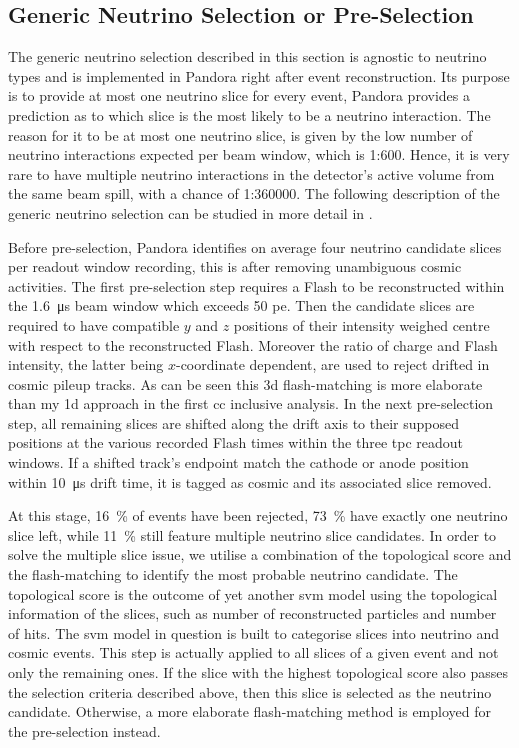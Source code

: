 \subsection{Generic Neutrino Selection or Pre-Selection} \label{sec:NewPreSelection}
The generic neutrino selection described in this section is agnostic to neutrino types and is implemented in \gls{Pandora} right after event reconstruction. Its purpose is to provide at most one neutrino slice for every event, \ie \gls{Pandora} provides a prediction as to which slice is the most likely to be a neutrino interaction. The reason for it to be at most one neutrino slice, is given by the low number of neutrino interactions expected per beam window, which is \num{1}:\num{600}. Hence, it is very rare to have multiple neutrino interactions in the detector's active volume from the same beam spill, with a chance of \num{1}:\num{360000}. The following description of the generic neutrino selection can be studied in more detail in \cite{PreSelectionPhDWouter}.

Before pre-selection, \gls{Pandora} identifies on average four neutrino candidate slices per readout window recording, this is after removing unambiguous cosmic activities. The first pre-selection step requires a \gls{Flash} to be reconstructed within the \SI{1.6}{\micro\second} beam window which exceeds \num{50} \gls{pe}. Then the candidate slices are required to have compatible $y$ and $z$ positions of their intensity weighed centre with respect to the reconstructed \gls{Flash}. Moreover the ratio of charge and \gls{Flash} intensity, the latter being $x$-coordinate dependent, are used to reject drifted in cosmic pileup tracks. As can be seen this \gls{3d} flash-matching is more elaborate than my \gls{1d} approach in the first \gls{cc} inclusive analysis. In the next pre-selection step, all remaining slices are shifted along the drift axis to their supposed positions at the various recorded \gls{Flash} times within the three \gls{tpc} readout windows. If a shifted track's endpoint match the cathode or anode position within \SI{10}{\micro\second} drift time, it is tagged as cosmic and its associated slice removed. 

At this stage, \SI{16}{\percent} of events have been rejected, \SI{73}{\percent} have exactly one neutrino slice left, while \SI{11}{\percent} still feature multiple neutrino slice candidates. In order to solve the multiple slice issue, we utilise a combination of the topological score and the flash-matching to identify the most probable neutrino candidate. The topological score is the outcome of yet another \gls{svm} model using the topological information of the slices, such as number of reconstructed particles and number of hits. The \gls{svm} model in question is built to categorise slices into neutrino and cosmic events. This step is actually applied to all slices of a given event and not only the remaining ones. If the slice with the highest topological score also passes the selection criteria described above, then this slice is selected as the neutrino candidate. Otherwise, a more elaborate flash-matching method is employed for the pre-selection instead.

